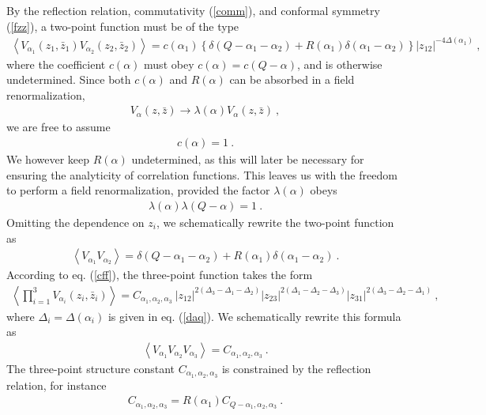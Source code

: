 \documentclass[12pt,a4paper,notitlepage]{report}
\newcommand \la {\left\langle}
\newcommand \ra {\right\rangle}
\numberwithin{equation}{section}
\theoremstyle{break}
\begin{document}
By the reflection relation, commutativity (\ref{comm}), and conformal symmetry (\ref{fzz}), a two-point function must be of the type 
\begin{align}
 \la V_{\alpha_1}(z_1,\bar{z}_1) V_{\alpha_2}(z_2,\bar{z}_2)\ra = c(\alpha_1) \left\{ \delta(Q-\alpha_1-\alpha_2) + R(\alpha_1)\delta(\alpha_1-\alpha_2)\right\} |z_{12}|^{-4\Delta(\alpha_1)}\ , 
\label{vvc}
\end{align}
where the coefficient $c(\alpha)$ must obey $c(\alpha)=c(Q-\alpha)$, and is otherwise undetermined. Since both $c(\alpha)$ and $R(\alpha)$ can be absorbed in a field renormalization, 
\begin{align}
 V_\alpha(z,\bar{z}) \rightarrow \lambda(\alpha)  V_\alpha(z,\bar{z}) \ ,
\label{vlv}
\end{align}
we are free to assume
\begin{align}
 c(\alpha)=1\ .
\end{align}
We however keep $R(\alpha)$ undetermined, as this will later be necessary for ensuring the analyticity of correlation functions. This leaves us with the freedom to perform a field renormalization, provided the factor $\lambda(\alpha)$ obeys
\begin{align}
 \lambda(\alpha)\lambda(Q-\alpha) = 1\ .
\label{llo}
\end{align}
Omitting the dependence on $z_i$, we schematically rewrite the two-point function as 
\begin{align}
 \boxed{\la V_{\alpha_1}V_{\alpha_2} \ra = \delta(Q-\alpha_1-\alpha_2) + R(\alpha_1)\delta(\alpha_1-\alpha_2) }\ .
\label{vvss}
\end{align}
According to eq. (\ref{cff}), the three-point function takes the form
\begin{align}
\la \prod_{i=1}^3 V_{\alpha_i}(z_i,\bar{z}_i)\ra = C_{\alpha_1,\alpha_2,\alpha_3}\ |z_{12}|^{2(\Delta_3-\Delta_1-\Delta_2)} |z_{23}|^{2(\Delta_1-\Delta_2-\Delta_3)} |z_{31}|^{2(\Delta_3-\Delta_2-\Delta_1)}\ ,
\label{vvv}
\end{align}
where $\Delta_i = \Delta(\alpha_i)$ is given in eq. (\ref{daq}). We schematically rewrite this formula as 
\begin{align}
 \boxed{ \la V_{\alpha_1}V_{\alpha_2}V_{\alpha_3} \ra = C_{\alpha_1,\alpha_2,\alpha_3} }\ .
\label{vvvs}
\end{align}
The three-point structure constant $C_{\alpha_1,\alpha_2,\alpha_3}$ is constrained by the reflection relation, for instance
\begin{align}
 C_{\alpha_1,\alpha_2,\alpha_3} = R(\alpha_1) C_{Q-\alpha_1,\alpha_2,\alpha_3}\ .
\label{crc}
\end{align}
\end{document}
